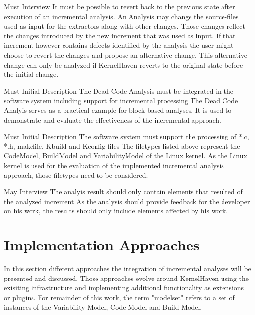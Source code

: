 \documentclass[a4paper]{article}
\begin{document}
\begin{req} \label{req:commit-hook}
\reqtable
	{Must}  {Interview}
	{It must be possible to revert back to the previous state after execution of an incremental analysis.}
	{An Analysis may change the source-files used as input for the extractors along with other changes. Those changes reflect the changes introduced by the new increment that was used as input. If that increment however contains defects identified by the analysis the user might choose to revert the changes and propose an alternative change. This alternative change can only be analyzed if KernelHaven reverts to the original state before the initial change.}

\end{req}

\begin{req} 
\reqtable
	{Must}  {Initial Description}
	{The Dead Code Analysis must be integrated in the software system including support for incremental processing}
	{The Dead Code Analyis serves as a practical example for block based analyses. It is used to demonstrate and evaluate the effectiveness of the incremental approach.}
\end{req}

\clearpage
\begin{req} 
\reqtable
    {Must}  {Initial Description}
	{The software system must support the processing of *.c, *.h, makefile, Kbuild and Kconfig files}
	{The filetypes listed above represent the CodeModel, BuildModel and VariabilityModel of the Linux kernel. As the Linux kernel is used for the evaluation of the implemented incremental analysis approach, those filetypes need to be considered.}
\end{req}

\begin{req} 
\reqtable
    {May}  {Interview}
	{The analyis result should only contain elements that resulted of the analyzed increment}
	{As the analysis should provide feedback for the developer on his work, the results should only include elements affected by his work.}
\end{req}

\newpage

\section{Implementation Approaches}

In this section different approaches the integration of incremental analyses will be presented and discussed. Those approaches evolve around KernelHaven using the exisiting infrastructure and implementing additional functionality as extensions or plugins. For remainder of this work, the term "modelset" refers to a set of instances of the Variability-Model, Code-Model and Build-Model.
\end{document}
